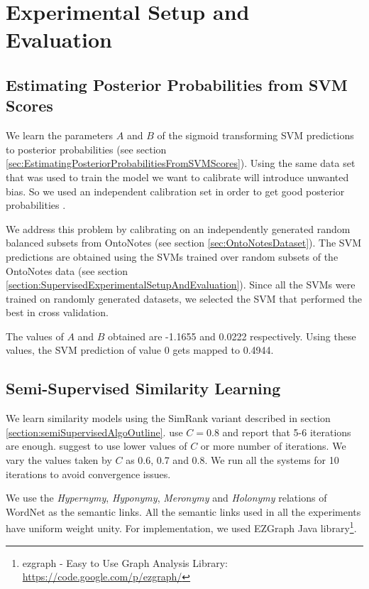 \section{Experimental Setup and Evaluation}
\label{section:evaluation}
\subsection{Estimating Posterior Probabilities from SVM Scores}
We learn the parameters $A$ and $B$ of the sigmoid transforming SVM predictions to posterior probabilities (see section \ref{sec:EstimatingPosteriorProbabilitiesFromSVMScores}). Using the same data set that was used to train the model we want to calibrate will introduce unwanted bias. So we used an independent calibration set in order to get good posterior probabilities \citep{Niculescu-Mizil:2005}.

We address this problem by calibrating on an independently generated random balanced subsets from OntoNotes (see section \ref{sec:OntoNotesDataset}). The SVM predictions are obtained using the SVMs trained over random subsets of the OntoNotes data (see section \ref{section:SupervisedExperimentalSetupAndEvaluation}). Since all the SVMs were trained on randomly generated datasets, we selected the SVM that performed the best in cross validation.

The values of $A$ and $B$ obtained are -1.1655 and 0.0222 respectively. Using these values, the SVM prediction of value 0 gets mapped to 0.4944. 

\subsection{Semi-Supervised Similarity Learning}
We learn similarity models using the SimRank variant described in section \ref{section:semiSupervisedAlgoOutline}. \citep{Jeh02simrank} use $C=0.8$ and report that 5-6 iterations are enough. \citep{LizorkinSimrank} suggest to use lower values of $C$ or more number of iterations. We vary the values taken by $C$ as 0.6, 0.7 and 0.8. We run all the systems for 10 iterations to avoid convergence issues. 

We use the \textit{Hypernymy}, \textit{Hyponymy}, \textit{Meronymy} and \textit{Holonymy} relations of WordNet as the semantic links. All the semantic links used in all the experiments have uniform weight unity. For implementation, we used EZGraph Java library\footnote{ezgraph - Easy to Use Graph Analysis Library:  \url{https://code.google.com/p/ezgraph/}}.

